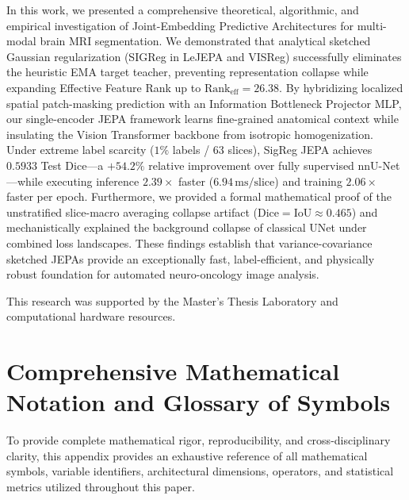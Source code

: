 \documentclass{article}
\begin{document}
In this work, we presented a comprehensive theoretical, algorithmic, and empirical investigation of Joint-Embedding Predictive Architectures for multi-modal brain MRI segmentation. We demonstrated that analytical sketched Gaussian regularization (SIGReg in LeJEPA and VISReg) successfully eliminates the heuristic EMA target teacher, preventing representation collapse while expanding Effective Feature Rank up to $\text{Rank}_{\text{eff}} = 26.38$. By hybridizing localized spatial patch-masking prediction with an Information Bottleneck Projector MLP, our single-encoder JEPA framework learns fine-grained anatomical context while insulating the Vision Transformer backbone from isotropic homogenization. Under extreme label scarcity ($1\%$ labels / $63$ slices), SigReg JEPA achieves $0.5933$ Test Dice—a $+54.2\%$ relative improvement over fully supervised nnU-Net—while executing inference $2.39\times$ faster ($6.94\,\text{ms/slice}$) and training $2.06\times$ faster per epoch. Furthermore, we provided a formal mathematical proof of the unstratified slice-macro averaging collapse artifact ($\text{Dice} = \text{IoU} \approx 0.465$) and mechanistically explained the background collapse of classical UNet under combined loss landscapes. These findings establish that variance-covariance sketched JEPAs provide an exceptionally fast, label-efficient, and physically robust foundation for automated neuro-oncology image analysis.


\begin{ack}
This research was supported by the Master's Thesis Laboratory and computational hardware resources.
\end{ack}





\newpage
\appendix

\section{Comprehensive Mathematical Notation and Glossary of Symbols}
\label{sec:appendix_math_notation}

To provide complete mathematical rigor, reproducibility, and cross-disciplinary clarity, this appendix provides an exhaustive reference of all mathematical symbols, variable identifiers, architectural dimensions, operators, and statistical metrics utilized throughout this paper.
\end{document}
